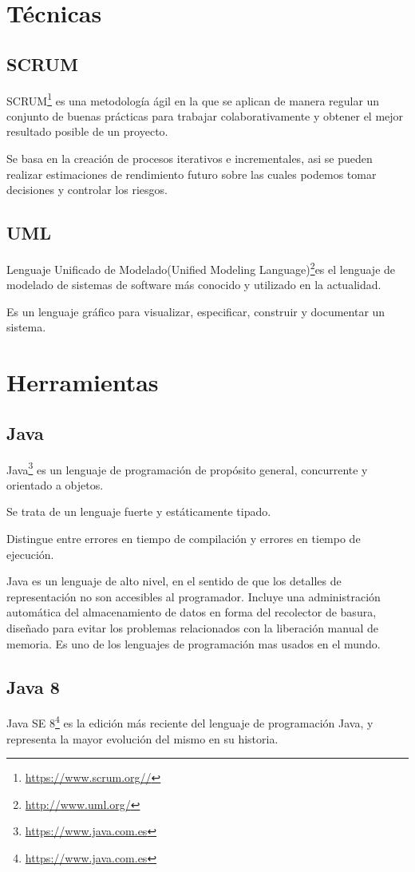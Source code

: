 
\section{Técnicas}

\subsection{SCRUM}
SCRUM\footnote{\url{https://www.scrum.org//}} es una metodología ágil en la que se aplican de manera regular un conjunto de buenas prácticas para trabajar colaborativamente y obtener el mejor resultado posible de un proyecto.

Se basa en la creación de procesos iterativos e incrementales, asi se pueden realizar estimaciones de rendimiento futuro sobre las cuales podemos tomar decisiones y controlar los riesgos.
\subsection{UML}
Lenguaje Unificado de Modelado(Unified Modeling Language)\footnote{\url{http://www.uml.org/}}es el lenguaje de modelado de sistemas de software más conocido y utilizado en la actualidad.

Es un lenguaje gráfico para visualizar, especificar, construir y documentar un sistema.
\section{Herramientas}
\subsection{Java}
Java\footnote{\url{https://www.java.com.es}} es un lenguaje de programación de propósito general, concurrente y orientado a objetos.

Se trata de un lenguaje fuerte y estáticamente tipado.

Distingue entre errores en tiempo de compilación y errores en tiempo de ejecución.

Java es un lenguaje de alto nivel, en el sentido de que los detalles de representación no son accesibles al programador. 
Incluye una administración automática del almacenamiento de datos en forma del recolector de basura, diseñado para evitar los problemas relacionados con la liberación manual de memoria. Es uno de los lenguajes de programación mas usados en el mundo.

\subsection{Java 8}
Java SE 8\footnote{\url{https://www.java.com.es}} es la edición más reciente del lenguaje de programación Java, y representa la mayor evolución del mismo en su historia.


